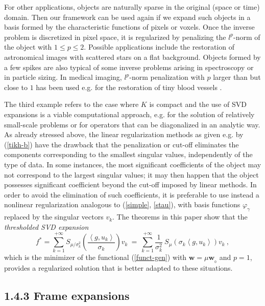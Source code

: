 \documentclass[10pt]{article}
\def\vpg{\varphi_{\gamma}}
\newcommand\eref[1]{(\ref{#1})}
\begin{document}
For other applications, objects are naturally sparse in the original
(space or time) domain. Then our framework can be used again if we expand such
objects in a basis formed by the characteristic functions of pixels or voxels.
Once the inverse problem is discretized in pixel space, it is regularized by
penalizing the $l^p$-norm of the object with $1 \le p \le 2$. Possible
applications include the restoration of astronomical images with scattered
stars
on a flat background. Objects formed by a few spikes are also typical of some
inverse
problems arising in spectroscopy or in particle sizing. In medical
imaging, $l^p$-norm
penalization with $p$ larger than but close to $1$ has been used e.g.
for the restoration of tiny blood vessels \cite{Li02}.

The third example refers to the case where $K$ is compact and the use of SVD
expansions is a viable  computational approach, e.g. for the solution of
relatively  small-scale problems or
for operators that can be diagonalized in an analytic way. As already stressed
above, the linear regularization methods as given e.g. by \eref{tikh-b}
have the drawback that the penalization or cut-off eliminates the components
corresponding to the
smallest singular values, independently of the type of data. In some
instances,
the most
significant coefficients of the object may not correspond to the largest
singular
values; it may then happen that the object possesses
significant coefficient beyond
the cut-off imposed by linear methods. In order to avoid the elimination of
such
coefficients, it is preferable to use instead a
nonlinear regularization analogous to (\ref{simple}, \ref{stau}), with basis
functions $\vpg$ replaced
by the singular vectors $v_k$.
The theorems in this paper show that the {\it thresholded SVD expansion}
$$
f^* = \sum_{k=1}^{+\infty} S_{\mu/\sigma_k^2}
\left(\frac{\left< g,u_k\right>}{\sigma_k}
\right) v_k
~=~ \sum_{k=1}^{+\infty}\frac{1}{\sigma_k^2} ~ S_{\mu}
\left( \sigma_k \left< g,u_k\right>
\right) v_k~,
$$
which is the minimizer of the functional \eref{funct-gen}  with
$\mathbf{w}=\mu \mathbf{w}_{_0}$ and $p=1$,
provides a regularized solution that is better adapted to these
situations.

\subsection*{1.4.3 Frame expansions}
\end{document}
